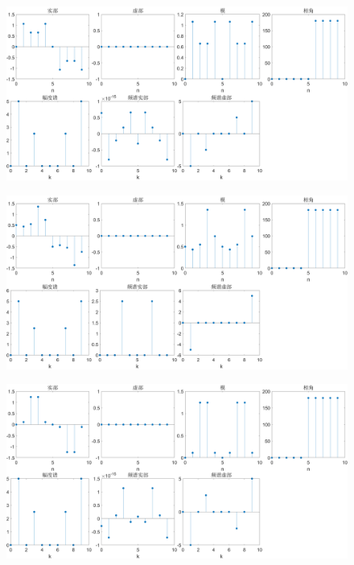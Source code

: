 \documentclass{../source/Experiment}
\begin{document}
            \begin{figure}[H]
                \centering
                \includegraphics[width = \textwidth]{src/2_1_5a.png}
            \end{figure}
            \begin{figure}[H]
                \centering
                \includegraphics[width = \textwidth]{src/2_1_5b.png}
            \end{figure}
            \begin{figure}[H]
                \centering
                \includegraphics[width = \textwidth]{src/2_1_5c.png}
            \end{figure}
\end{document}
